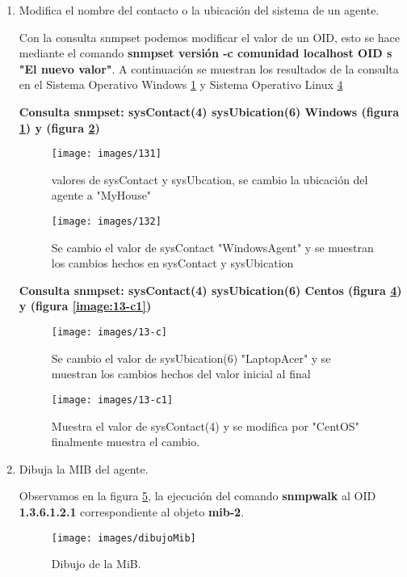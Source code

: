 \begin{enumerate}
\item Modifica el nombre del contacto o la ubicación del sistema de un agente.

Con la consulta snmpset podemos modificar el valor de un OID, esto se hace mediante el comando \textbf{snmpset versión -c comunidad localhost OID s "El nuevo valor"}. A continuación se muestran los resultados de la consulta en el Sistema Operativo Windows  \ref{image:131}  y Sistema Operativo Linux  \ref{image:13-c}



\textbf{Consulta snmpset: sysContact(4) sysUbication(6) Windows (figura   \ref{image:131}) y   (figura  \ref{image:132})}
\FloatBarrier
\begin{figure}[htbp!]
		\centering
	\texttt{[image: images/131]}
		\caption{valores de sysContact y sysUbcation, se cambio la ubicación del agente a "MyHouse"}		\label{image:131}
\end{figure}
\begin{figure}[htbp!]
		\centering
	\texttt{[image: images/132]}
		\caption{Se cambio el valor de sysContact "WindowsAgent" y se muestran los cambios hechos en sysContact y sysUbication}		\label{image:132}
\end{figure}
\FloatBarrier


\textbf{Consulta snmpset: sysContact(4) sysUbication(6) Centos (figura  \ref{image:13-c}) y   (figura  \ref{image:13-c1})}
\FloatBarrier
\begin{figure}[htbp!]
		\centering
	\texttt{[image: images/13-c]}
		\caption{Se cambio el valor de sysUbication(6) "LaptopAcer" y se muestran los cambios hechos del valor inicial al final}		\label{image:13-c}
\end{figure}
\begin{figure}[htbp!]
		\centering
	\texttt{[image: images/13-c1]}
		\caption{Muestra el valor de sysContact(4) y se modifica por "CentOS" finalmente muestra el cambio.}		\label{image:13-c}
\end{figure}
\FloatBarrier



\item Dibuja la MIB del agente.

Observamos en la figura \ref{image:dibujoMib}, la ejecución del comando \textbf{snmpwalk} al OID \textbf{1.3.6.1.2.1} correspondiente al objeto \textbf{mib-2}.
\FloatBarrier
\begin{figure}[htbp!]
		\centering
	\texttt{[image: images/dibujoMib]}
		\caption{Dibujo de la MiB.}
\label{image:dibujoMib}
\end{figure}
\FloatBarrier
\end{enumerate}